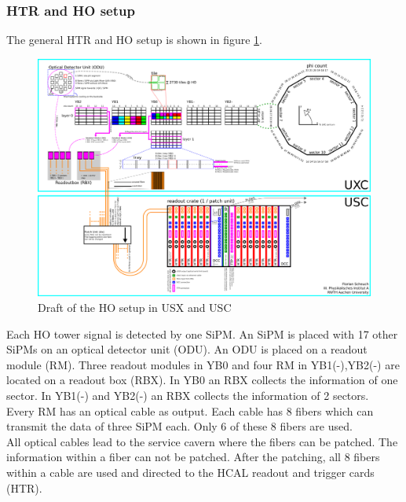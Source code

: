 \subsubsection{HTR and HO setup}
The general HTR and HO setup is shown in figure \ref{HOPlan}.\\
\begin{figure}[b]
\centering
\begin{minipage}[t]{0.95\textwidth}
\includegraphics[height=\textwidth, angle=90]{Figures/scheuch/Chart.png}
\caption{Draft of the HO setup in USX and USC}
\label{HOPlan}
\end{minipage}
\end{figure}
Each HO tower signal is detected by one SiPM. An SiPM is placed with 17 other SiPMs on an optical detector unit (ODU). An ODU is placed on a readout module (RM). Three readout modules in YB0 and four RM in YB1(-),YB2(-) are located on a readout box (RBX). In YB0 an RBX collects the information of one sector. In YB1(-) and YB2(-) an RBX collects the information of 2 sectors.\\
Every RM has an optical cable as output. Each cable has 8 fibers which can transmit the data of three SiPM each. Only 6 of these 8 fibers are used.\\
All optical cables lead to the service cavern where the fibers can be patched. The information within a fiber can not be patched. After the patching, all 8 fibers within a cable are used and directed to the HCAL readout and trigger cards (HTR).\\
